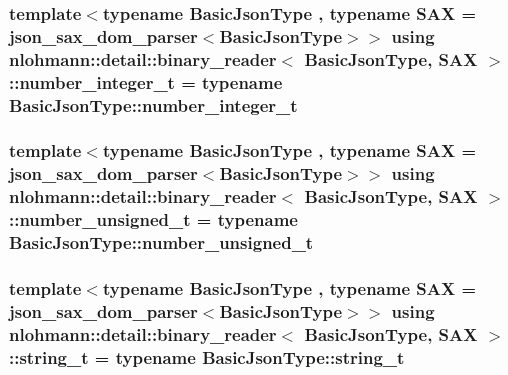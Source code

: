 \subsubsection[{\texorpdfstring{number\+\_\+integer\+\_\+t}{number_integer_t}}]{\setlength{\rightskip}{0pt plus 5cm}template$<$typename Basic\+Json\+Type , typename S\+AX  = json\+\_\+sax\+\_\+dom\+\_\+parser$<$\+Basic\+Json\+Type$>$$>$ using {\bf nlohmann\+::detail\+::binary\+\_\+reader}$<$ Basic\+Json\+Type, S\+AX $>$\+::{\bf number\+\_\+integer\+\_\+t} =  typename Basic\+Json\+Type\+::number\+\_\+integer\+\_\+t\hspace{0.3cm}{\ttfamily [private]}}\hypertarget{classnlohmann_1_1detail_1_1binary__reader_aa093d9bce6c6ec715a049f2a26d7c4d5}{}\label{classnlohmann_1_1detail_1_1binary__reader_aa093d9bce6c6ec715a049f2a26d7c4d5}
\subsubsection[{\texorpdfstring{number\+\_\+unsigned\+\_\+t}{number_unsigned_t}}]{\setlength{\rightskip}{0pt plus 5cm}template$<$typename Basic\+Json\+Type , typename S\+AX  = json\+\_\+sax\+\_\+dom\+\_\+parser$<$\+Basic\+Json\+Type$>$$>$ using {\bf nlohmann\+::detail\+::binary\+\_\+reader}$<$ Basic\+Json\+Type, S\+AX $>$\+::{\bf number\+\_\+unsigned\+\_\+t} =  typename Basic\+Json\+Type\+::number\+\_\+unsigned\+\_\+t\hspace{0.3cm}{\ttfamily [private]}}\hypertarget{classnlohmann_1_1detail_1_1binary__reader_a13bb5e2014c4cdf013d8715157cb456e}{}\label{classnlohmann_1_1detail_1_1binary__reader_a13bb5e2014c4cdf013d8715157cb456e}
\subsubsection[{\texorpdfstring{string\+\_\+t}{string_t}}]{\setlength{\rightskip}{0pt plus 5cm}template$<$typename Basic\+Json\+Type , typename S\+AX  = json\+\_\+sax\+\_\+dom\+\_\+parser$<$\+Basic\+Json\+Type$>$$>$ using {\bf nlohmann\+::detail\+::binary\+\_\+reader}$<$ Basic\+Json\+Type, S\+AX $>$\+::{\bf string\+\_\+t} =  typename Basic\+Json\+Type\+::string\+\_\+t\hspace{0.3cm}{\ttfamily [private]}}\hypertarget{classnlohmann_1_1detail_1_1binary__reader_aa0b9729917ca7ee6ed01e3792341316e}{}\label{classnlohmann_1_1detail_1_1binary__reader_aa0b9729917ca7ee6ed01e3792341316e}



